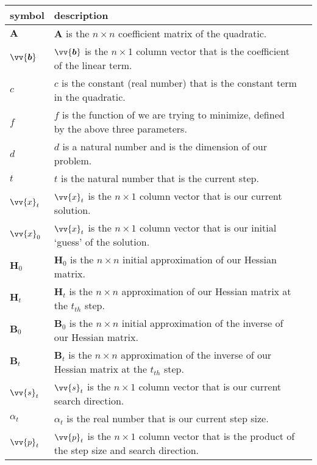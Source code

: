 \documentclass[12pt, titlepage]{article}
\begin{document}
\renewcommand{\arraystretch}{1.2}
\noindent \begin{tabularx}{1.0\textwidth}{l l X}
\textbf{symbol} & \textbf{description}\\
\midrule 
$\mathbf{A}$ & $\mathbf{A}$ is the $n \times n$ coefficient matrix of the quadratic.
\\
$\vv{\bm{b}}$ & $\vv{\bm{b}}$ is the $n \times 1$ column vector that is the coefficient of the linear term. 
\\ 
$c$ & $c$ is the constant (real number) that is the constant term in the quadratic.
\\
$f$ & $f$ is the function of we are trying to minimize, defined by the above three parameters.  
\\
$d$ & $d$ is a natural number and is the dimension of our problem. 
\\
$t$ & $t$ is the natural number that is the current step.
\\
$\vv{x}_{t}$ & $\vv{x}_{t}$ is the $n \times 1$ column vector that is our current solution.
\\
$\vv{x}_{0}$ & $\vv{x}_{t}$ is the $n \times 1$ column vector that is our initial `guess' of the solution.
\\
$\mathbf{H}_0$ & $\mathbf{H}_0$ is the $n \times n$ initial approximation of our Hessian matrix.
\\
$\mathbf{H}_t$ & $\mathbf{H}_t$ is the $n \times n$ approximation of our Hessian matrix at the $t_{th}$ step.
\\
$\mathbf{B}_0$ & $\mathbf{B}_0$ is the $n \times n$ initial approximation of the inverse of our Hessian matrix.
\\
$\mathbf{B}_t$ & $\mathbf{B}_t$ is the $n \times n$ approximation of the inverse of our Hessian matrix at the $t_{th}$ step.
\\
$\vv{s}_{t}$ & $\vv{s}_{t}$ is the $n \times 1$ column vector that is our current search direction.
\\
$\alpha_{t}$ & $\alpha_{t}$ is the real number that is our current step size.
\\
$\vv{p}_{t}$ & $\vv{p}_{t}$ is the $n \times 1$ column vector that is the product of the step size and search direction.
\\
\bottomrule
\end{tabularx}

\newpage
\end{document}
